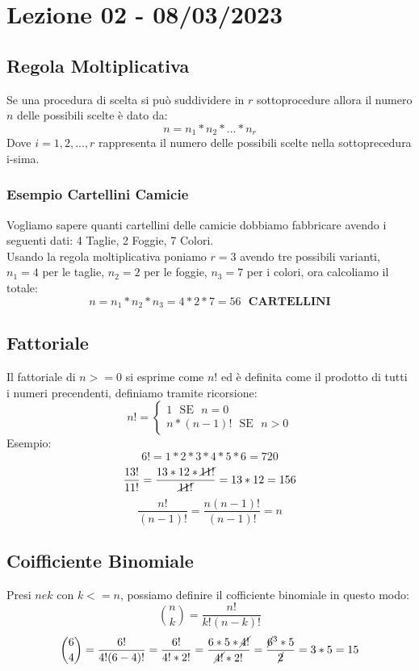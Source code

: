 \section{Lezione 02 - 08/03/2023}

\subsection{Regola Moltiplicativa}
Se una procedura di scelta si può suddividere in $r$ sottoprocedure allora il numero $n$ delle possibili scelte è dato da:
$$ n = n_1*n_2*...*n_r$$
Dove $i=1,2,...,r$ rappresenta il numero delle possibili scelte nella sottoprecedura i-sima.\\
\subsubsection{Esempio Cartellini Camicie}
Vogliamo sapere quanti cartellini delle camicie dobbiamo fabbricare avendo i seguenti dati:
4 Taglie, 2 Foggie, 7 Colori.\\
Usando la regola moltiplicativa poniamo $r=3$ avendo tre possibili varianti, $n_1=4$ per le taglie, $n_2=2$ per le foggie, $n_3=7$ per i colori, ora calcoliamo il totale:
$$ n = n_1*n_2*n_3 = 4*2*7 = 56 \:\:\: \textbf{CARTELLINI} $$

\subsection{Fattoriale}
Il fattoriale di $n>=0$ si esprime come $n!$ ed è definita come il prodotto di tutti i numeri precendenti, definiamo tramite ricorsione:
\begin{equation*}
n! = 
\begin{cases}
1 \: \: \: \text{SE} \: \: \: n=0\\
n*(n-1)! \: \: \: \text{SE} \: \: \: n>0
\end{cases}
\end{equation*}
Esempio: 
$$6! = 1*2*3*4*5*6 = 720$$
$$ \frac{13!}{11!} = \frac{13*12*\cancel{11!}}{\cancel{11!}} = 13*12 = 156 $$
$$ \frac{n!}{(n-1)!} = \frac{n(n-1)!}{(n-1)!} = n $$
\newpage

\subsection{Coifficiente Binomiale}
Presi $n e k$ con $k<=n$, possiamo definire il cofficiente binomiale in questo modo:
$$ \binom{n}{k} = \frac{n!}{k!(n-k)!} $$
$$ \binom{6}{4} = \frac{6!}{4!(6-4)!} = \frac{6!}{4!*2!} = \frac{6*5*\cancel{4!}}{\cancel{4!}*2!} = \frac{\cancel{6}^3*5}{\cancel{2}} = 3*5 = 15 $$

